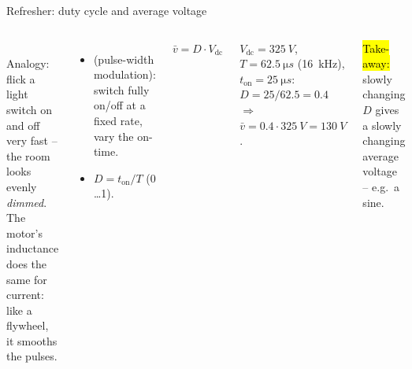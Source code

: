 \documentclass[aspectratio=169,10pt]{beamer}
\begin{document}
\begin{frame}[t]{Refresher: duty cycle and average voltage}
\begin{columns}[T,onlytextwidth]
\centering
{}\\[2mm]
\small Analogy: flick a light switch on and off very fast -- the room looks evenly \emph{dimmed}.
The motor's inductance does the same for current: like a flywheel, it smooths the pulses.
\begin{itemize}\small
\item {} (pulse-width modulation): switch fully on/off at a fixed rate, vary the on-time.
\item {} $D=t_\text{on}/T$ (0 \ldots 1).
\end{itemize}
\begin{eqbox}\centering
$\bar v = D\cdot V_\text{dc}$
\end{eqbox}
\begin{defbox}[Example]
\small $V_\text{dc}=\SI{325}{V}$, $T=\SI{62.5}{\micro s}$ (\SI{16}{kHz}), $t_\text{on}=\SI{25}{\micro s}$:\\
$D=25/62.5=0.4$ $\Rightarrow$ $\bar v=0.4\cdot\SI{325}{V}=\SI{130}{V}$.
\end{defbox}
\small\hl{Take-away:} slowly changing $D$ gives a slowly changing average voltage -- e.g.\ a sine.
\end{columns}
\end{frame}
\end{document}
